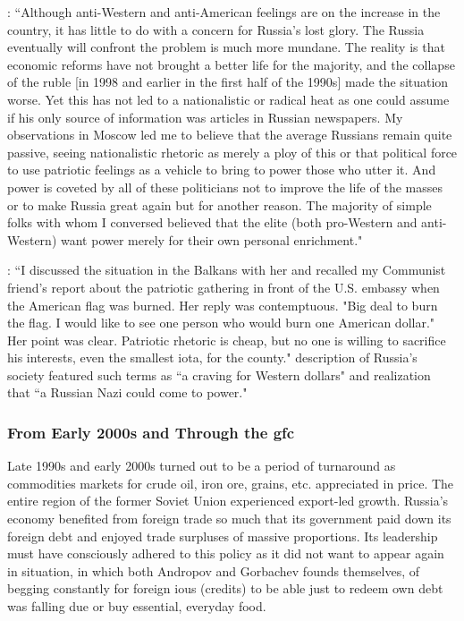 \citep{shlapentokh2000}: ``Although anti-Western and anti-American feelings are on the increase
in the country, it has little to do with a concern for Russia's lost glory. The
Russia eventually will confront the problem is much more mundane. The reality is that economic reforms have not brought a better life for the majority, and the collapse of the ruble [in 1998 and earlier in the first half of the 1990s] made the situation worse. Yet this has not led to a nationalistic or radical heat as one could assume if his only source of information was articles in Russian newspapers. My observations in Moscow led me to believe that the average Russians remain quite passive, seeing nationalistic rhetoric as merely a ploy of this or that political force to use patriotic feelings as a vehicle to bring to power those who utter it. And power is coveted by all of these politicians not to improve the life of the masses or to make Russia great again but for another reason. The majority of simple folks with whom I conversed believed that the elite (both pro-Western and anti-Western) want power merely for their own personal enrichment."

\citep{shlapentokh2000}: ``I discussed the situation in the Balkans with her and recalled my
Communist friend's report about the patriotic gathering in front of the U.S. embassy when the American flag was burned. Her reply was contemptuous.
"Big deal to burn the flag. I would like to see
one person who would burn one American
dollar." Her point was clear. Patriotic rhetoric
is cheap, but no one is willing to sacrifice his
interests, even the smallest iota, for the
county." \citeauthor{shlapentokh2000} description of Russia's society featured such terms as ``a craving for Western dollars" and realization that ``a Russian Nazi could come to power."

\subsubsection{From Early 2000s and Through the \acs{gfc}}

Late 1990s and early 2000s turned out to be a period of turnaround as
commodities markets for crude oil, iron ore, grains, etc. appreciated in
price. The entire region of the former Soviet Union experienced
export-led growth. Russia's economy benefited from foreign trade so much
that its government paid down its foreign debt and enjoyed trade
surpluses of massive proportions. Its leadership must have consciously
adhered to this policy as it did not want to appear again in situation,
in which both Andropov and Gorbachev founds themselves, of begging
constantly for foreign \acp{iou} (credits) to be able just to redeem own debt
was falling due or buy essential, everyday food.

